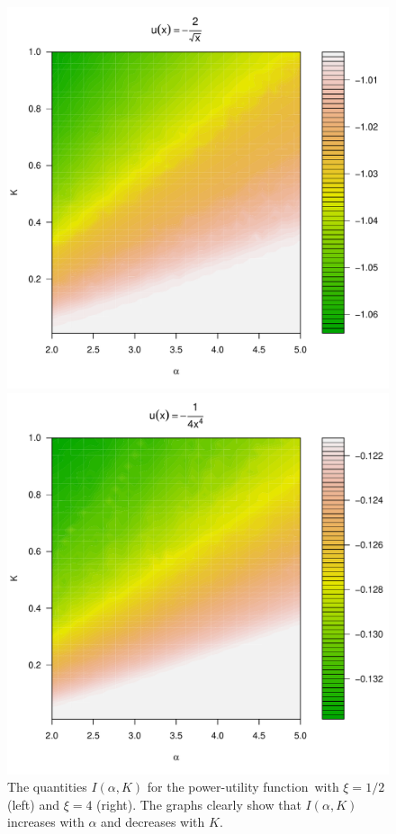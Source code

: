 \documentclass[11pt,a4]{amsart}
\newcommand{\fct}{function}
\newcommand{\1}{{\mathbf 1}}
\begin{document}
\begin{figure}[htb!]
  \begin{minipage}{0.5\linewidth}
    \includegraphics[width=\textwidth]{preference_pareto5e-1.pdf}
  \end{minipage}\hfill
  \begin{minipage}{0.5\linewidth}
    \includegraphics[width=\textwidth]{preference_pareto4.pdf}
  \end{minipage}
  \caption{The quantities $I(\alpha, K)$ for the power-utility \fct\ with $\xi=1/2$ (left) and $\xi=4$ (right).
The graphs clearly show that  $I(\alpha, K)$ increases with $\alpha$ and decreases with $K$.
  }
  \label{fig:preference_pareto}
\end{figure}
\end{document}
